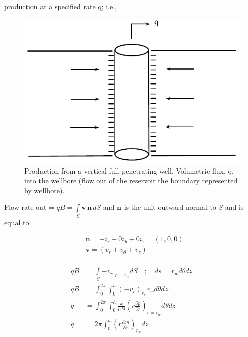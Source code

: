 \documentclass{llncs}
\numberwithin{equation}{section}
\numberwithin{figure}{section}
\numberwithin{table}{section}
\begin{document}
     production at a specified rate q; i.e.,
    \begin{figure}
        \begin{center}
        \includegraphics[scale=1]{Production_Full.pdf}
        \caption{Production from a vertical full penetrating well. Volumetric flux, q, into the wellbore (flow out of the reservoir the boundary represented by wellbore).}
        \end{center}
        \label{Production_Full}
    \end{figure}

    Flow rate out = $qB=\int\limits_{S}{\mathbf{v}\,\mathbf{n}\,dS}$ and $\mathbf{n}$ is the unit outward normal to $S$ and is equal to

    \begin{equation*}
        \begin{split}
        & \mathbf{n}=-{{i}_{r}}+0{{i}_{\theta }}+0{{i}_{z}}=\left( 1,0,0 \right) \\
        & \mathbf{v}=\left( {{v}_{r}}+{{v}_{\theta }}+{{v}_{z}} \right) \\
        \end{split}
    \end{equation*}

    \begin{equation*}
        \begin{split}
             qB&=\int\limits_{S}{-{{\left. {{v}_{r}} \right|}_{r={{r}_{w}}}}}dS\quad ;\quad ds={{r}_{w}}d\theta dz \\
             qB&=\int_{0}^{2\pi }{\int_{0}^{h}{{{\left( -{{v}_{r}} \right)}_{{{r}_{w}}}}{{r}_{w}}}}d\theta dz \\
             q&={{\int_{0}^{2\pi }{\int_{0}^{h}{\frac{k}{\mu B}\left( r\frac{\partial p}{\partial r} \right)}}}_{r={{r}_{w}}}}d\theta dz \\
             q&=2\pi {{\int_{0}^{h}{\left( r\frac{\partial m}{\partial r} \right)}}_{{{r}_{w}}}}dz \\
        \end{split}
    \end{equation*}
\end{document}
